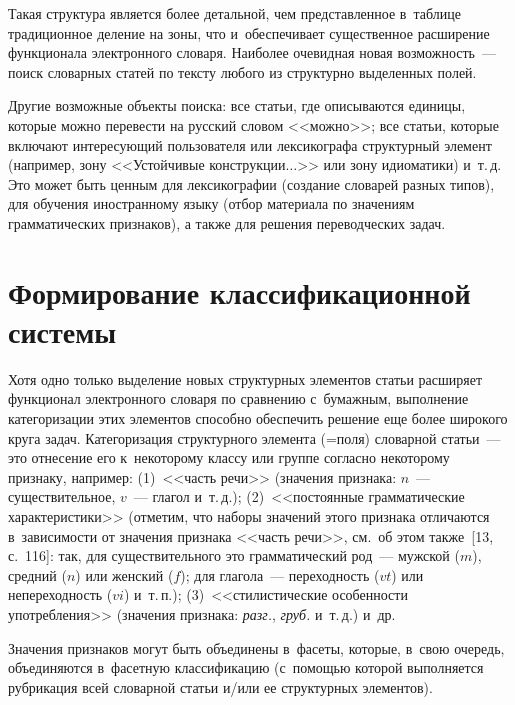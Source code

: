 \begin{multicols}{2}
  Такая структура является более детальной, чем представленное в~таблице 
традиционное деление на зоны, что и~обеспечивает существенное 
расширение функционала электронного словаря. Наиболее очевидная новая 
возможность~--- поиск словарных статей по тексту любого из структурно 
выделенных полей.
{

}
  
  Другие возможные объекты поиска: все статьи, где описываются единицы, 
которые можно перевести на русский словом <<можно>>; все статьи, 
которые включают интересующий пользователя или лексикографа 
структурный элемент (например, зону <<Устойчивые конструкции$\ldots$>> 
или зону идиоматики) и~т.\,д. Это может быть ценным для лексикографии 
(создание словарей разных типов), для обучения иностранному языку (отбор 
материала по значениям грамматических признаков), а также для решения 
переводческих задач.

  
\section{Формирование классификационной системы}


  Хотя одно только выделение новых структурных элементов 
статьи расширяет функционал электронного словаря по сравнению 
с~бумажным, выполнение категоризации этих элементов способно 
обеспечить решение еще более широкого круга задач. Категоризация 
структурного элемента (=\;по\-ля) словарной статьи~--- это отнесение его 
к~некоторому классу или группе согласно некоторому признаку, например: 
(1)~<<часть речи>> (значения признака: $n$~--- существительное, $v$~--- 
глагол и~т.\,д.); (2)~<<постоянные грамматические характеристики>> 
(отметим, что наборы значений этого признака отличаются в~зависимости от 
значения признака <<часть речи>>, см.\ об этом также~[13, с.~116]: так, для 
существительного это грамматический род~--- мужской ($m$), средний ($n$) 
или женский ($f$); для глагола~--- переходность ($vt$) или непереходность 
($vi$) и~т.\,п.); (3)~<<стилистические особенности упо\-треб\-ле\-ния>> (значения 
признака: \textit{разг.}, \textit{груб.} и~т.\,д.) и~др.
{

}
  
  Значения признаков могут быть объединены в~фасеты, которые, в~свою 
очередь, объединяются в~фасетную классификацию (с~по\-мощью которой 
выполняется рубрикация всей словарной статьи и/или ее структурных 
элементов).
  

\end{multicols}
